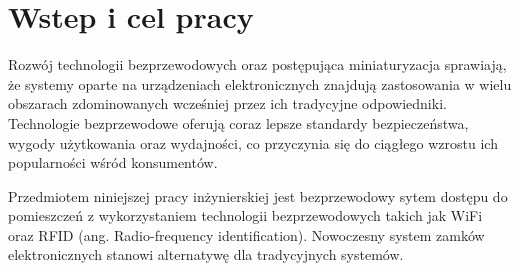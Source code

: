 \chapter{Wstep i cel pracy}

Rozwój technologii bezprzewodowych oraz postępująca miniaturyzacja sprawiają, że systemy oparte na urządzeniach elektronicznych znajdują zastosowania w wielu obszarach zdominowanych wcześniej przez ich tradycyjne odpowiedniki. Technologie bezprzewodowe oferują coraz lepsze standardy bezpieczeństwa, wygody użytkowania oraz wydajności, co przyczynia się do ciągłego wzrostu ich popularności wśród konsumentów.

Przedmiotem niniejszej pracy inżynierskiej jest bezprzewodowy sytem dostępu do pomieszczeń z wykorzystaniem technologii
bezprzewodowych takich jak WiFi oraz RFID (ang. Radio-frequency identification).
Nowoczesny system zamków elektronicznych stanowi alternatywę dla tradycyjnych systemów.